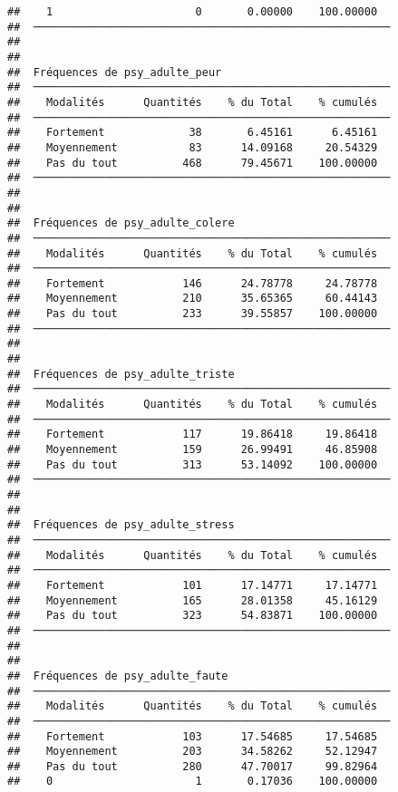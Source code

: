 \documentclass[
]{article}
\begin{document}
\begin{verbatim}
##    1                      0       0.00000    100.00000   
##  ─────────────────────────────────────────────────────── 
## 
## 
##  Fréquences de psy_adulte_peur                           
##  ─────────────────────────────────────────────────────── 
##    Modalités      Quantités    % du Total    % cumulés   
##  ─────────────────────────────────────────────────────── 
##    Fortement             38       6.45161      6.45161   
##    Moyennement           83      14.09168     20.54329   
##    Pas du tout          468      79.45671    100.00000   
##  ─────────────────────────────────────────────────────── 
## 
## 
##  Fréquences de psy_adulte_colere                         
##  ─────────────────────────────────────────────────────── 
##    Modalités      Quantités    % du Total    % cumulés   
##  ─────────────────────────────────────────────────────── 
##    Fortement            146      24.78778     24.78778   
##    Moyennement          210      35.65365     60.44143   
##    Pas du tout          233      39.55857    100.00000   
##  ─────────────────────────────────────────────────────── 
## 
## 
##  Fréquences de psy_adulte_triste                         
##  ─────────────────────────────────────────────────────── 
##    Modalités      Quantités    % du Total    % cumulés   
##  ─────────────────────────────────────────────────────── 
##    Fortement            117      19.86418     19.86418   
##    Moyennement          159      26.99491     46.85908   
##    Pas du tout          313      53.14092    100.00000   
##  ─────────────────────────────────────────────────────── 
## 
## 
##  Fréquences de psy_adulte_stress                         
##  ─────────────────────────────────────────────────────── 
##    Modalités      Quantités    % du Total    % cumulés   
##  ─────────────────────────────────────────────────────── 
##    Fortement            101      17.14771     17.14771   
##    Moyennement          165      28.01358     45.16129   
##    Pas du tout          323      54.83871    100.00000   
##  ─────────────────────────────────────────────────────── 
## 
## 
##  Fréquences de psy_adulte_faute                          
##  ─────────────────────────────────────────────────────── 
##    Modalités      Quantités    % du Total    % cumulés   
##  ─────────────────────────────────────────────────────── 
##    Fortement            103      17.54685     17.54685   
##    Moyennement          203      34.58262     52.12947   
##    Pas du tout          280      47.70017     99.82964   
##    0                      1       0.17036    100.00000   

\end{verbatim}
\end{document}
